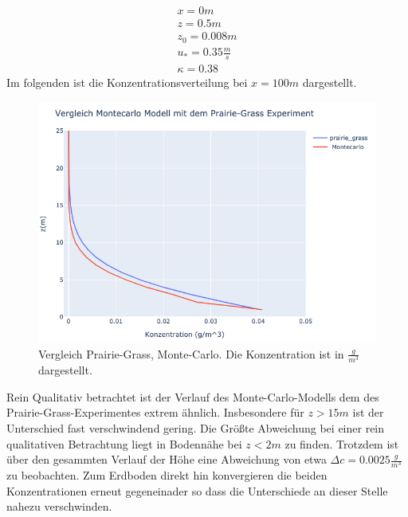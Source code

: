 \documentclass[ngerman]{scrartcl}
\begin{document}
\begin{align}
	x=0 \si{m} \\
	z= 0.5 \si{m} \\
	z_0 = 0.008 \si{m} \\
	u_{*}=0.35 \frac{\si{m}}{\si{s}}\\
	\kappa =0.38
\end{align}
Im folgenden ist die Konzentrationsverteilung bei $x=100\si{m}$ dargestellt.
\begin{figure}[H]
	\centering
	\includegraphics[scale=0.5]{Bilder/2.png}
	\caption{Vergleich Prairie-Grass, Monte-Carlo.  Die Konzentration ist in $\frac{\si{g}}{\si{m^3}}$ dargestellt.}
	\label{fig:my_label}
\end{figure}
Rein Qualitativ betrachtet ist der Verlauf des Monte-Carlo-Modells dem des Prairie-Grass-Experimentes extrem ähnlich. Insbesondere für $z>15 \si{m}$ ist der Unterschied fast verschwindend gering. Die Größte Abweichung bei einer rein qualitativen Betrachtung liegt in Bodennähe bei $z<2 \si{m}$ zu finden.  Trotzdem ist über den gesammten Verlauf der Höhe eine Abweichung von etwa $\Delta c=0.0025 \frac{\si{g}}{\si{m^3}} $
zu beobachten. Zum Erdboden direkt hin konvergieren die beiden Konzentrationen erneut gegeneinader so dass die Unterschiede an dieser Stelle nahezu verschwinden. 
\end{document}
